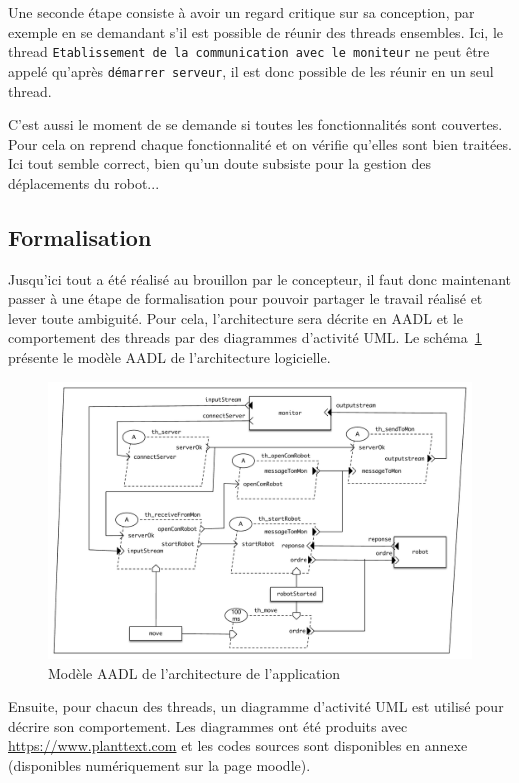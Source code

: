 \documentclass[11pt,a4paper]{paper}
\begin{document}
Une seconde étape consiste à avoir un regard critique sur sa conception, par exemple en se demandant s'il est possible de réunir des threads ensembles. Ici, le thread {\tt Etablissement de la communication avec le moniteur} ne peut être appelé qu'après {\tt démarrer serveur}, il est donc possible de les réunir en un seul thread.

C'est aussi le moment de se demande si toutes les fonctionnalités sont couvertes. Pour cela on reprend chaque fonctionnalité et on vérifie qu'elles sont bien traitées. Ici tout semble correct, bien qu'un doute subsiste pour la gestion des déplacements du robot...

\subsection{Formalisation}

Jusqu'ici tout a été réalisé au brouillon par le concepteur, il faut donc maintenant passer à une étape de formalisation pour pouvoir partager le travail réalisé et lever toute ambiguité. Pour cela, l'architecture sera décrite en AADL et le comportement des threads par des diagrammes d'activité UML. Le schéma~\ref{fig:AADL} présente le modèle AADL de l'architecture logicielle.

 \begin{figure}[htbp]
\begin{center}
\includegraphics[scale=0.5]{figures_pdf/fonc/AADL}
\end{center}
\caption{Modèle AADL de l'architecture de l'application}
\label{fig:AADL}
\end{figure}
\FloatBarrier

Ensuite, pour chacun des threads, un diagramme d'activité UML est utilisé pour décrire son comportement. Les diagrammes ont été produits avec \href{https://www.planttext.com}{https://www.planttext.com} et les codes sources sont disponibles en annexe (disponibles numériquement sur la page moodle).
\end{document}
